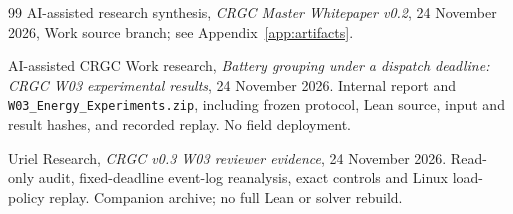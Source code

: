 \documentclass[11pt,letterpaper]{article}
\begin{document}
\begin{thebibliography}{99}
 AI-assisted research synthesis, \emph{CRGC Master Whitepaper v0.2}, 24 November 2026, Work source branch; see Appendix~\ref{app:artifacts}.

 AI-assisted CRGC Work research, \emph{Battery grouping under a dispatch deadline: CRGC W03 experimental results}, 24 November 2026. Internal report and \texttt{W03\_Energy\_Experiments.zip}, including frozen protocol, Lean source, input and result hashes, and recorded replay. No field deployment.

 Uriel Research, \emph{CRGC v0.3 W03 reviewer evidence}, 24 November 2026. Read-only audit, fixed-deadline event-log reanalysis, exact controls and Linux load-policy replay. Companion archive; no full Lean or solver rebuild.
\end{thebibliography}
\end{document}
